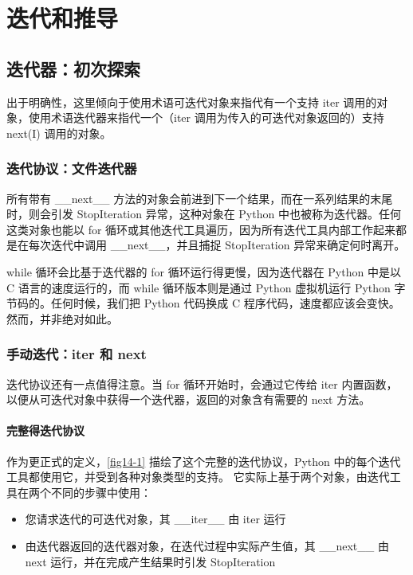 \chapter{迭代和推导}
\section{迭代器：初次探索}
出于明确性，这里倾向于使用术语可迭代对象来指代有一个支持 iter 调用的对象，使用术语迭代器来指代一个（iter 调用为传入的可迭代对象返回的）支持 next(I) 调用的对象。
\subsection{迭代协议：文件迭代器}
所有带有 \_\_next\_\_ 方法的对象会前进到下一个结果，而在一系列结果的末尾时，则会引发 StopIteration 异常，这种对象在 Python 中也被称为迭代器。任何这类对象也能以 for 循环或其他迭代工具遍历，因为所有迭代工具内部工作起来都是在每次迭代中调用 \_\_next\_\_，并且捕捉 StopIteration 异常来确定何时离开。

while 循环会比基于迭代器的 for 循环运行得更慢，因为迭代器在 Python 中是以 C 语言的速度运行的，而 while 循环版本则是通过 Python 虚拟机运行 Python 字节码的。任何时候，我们把 Python 代码换成 C 程序代码，速度都应该会变快。然而，并非绝对如此。
\subsection{手动迭代：iter 和 next}
迭代协议还有一点值得注意。当 for 循环开始时，会通过它传给 iter 内置函数，以便从可迭代对象中获得一个迭代器，返回的对象含有需要的 next 方法。
\subsubsection{完整得迭代协议}
作为更正式的定义，\autoref{fig14-1} 描绘了这个完整的迭代协议，Python 中的每个迭代工具都使用它，并受到各种对象类型的支持。 它实际上基于两个对象，由迭代工具在两个不同的步骤中使用：
\begin{itemize}
    \item 您请求迭代的可迭代对象，其 \_\_iter\_\_ 由 iter 运行
    \item  由迭代器返回的迭代器对象，在迭代过程中实际产生值，其 \_\_next\_\_ 由 next 运行，并在完成产生结果时引发 StopIteration
\end{itemize}

